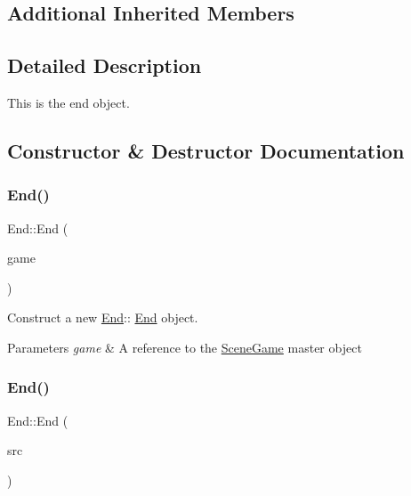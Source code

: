 \subsection*{Additional Inherited Members}


\subsection{Detailed Description}
This is the end object. 

\subsection{Constructor \& Destructor Documentation}
\mbox{\label{class_end_a47e2de547a735828a077df495d74a80e}} 
\subsubsection{\texorpdfstring{End()}{End()}\hspace{0.1cm}{\footnotesize\ttfamily [1/2]}}
{\footnotesize\ttfamily End\+::\+End (\begin{DoxyParamCaption}\item[{\hyperlink{class_scene_game}{Scene\+Game} \&}]{game }\end{DoxyParamCaption})\hspace{0.3cm}{\ttfamily [explicit]}}



Construct a new \hyperlink{class_end}{End}\+:\+: \hyperlink{class_end}{End} object. 


\begin{DoxyParams}{Parameters}
{\em game} & A reference to the \hyperlink{class_scene_game}{Scene\+Game} master object \\
\hline
\end{DoxyParams}
\mbox{\label{class_end_a630d7450a9969487d91aae9b3d35c6d8}} 
\subsubsection{\texorpdfstring{End()}{End()}\hspace{0.1cm}{\footnotesize\ttfamily [2/2]}}
{\footnotesize\ttfamily End\+::\+End (\begin{DoxyParamCaption}\item[{\hyperlink{class_end}{End} const \&}]{src }\end{DoxyParamCaption})}



